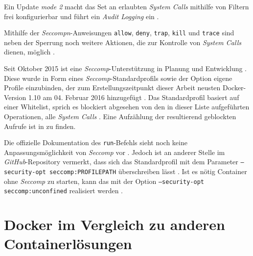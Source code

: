 \documentclass[../main.tex]{subfiles}
\begin{document}
			Ein Update \emph{mode 2} macht das Set an erlaubten \emph{System Calls} mithilfe von Filtern frei konfigurierbar und führt ein \emph{Audit Logging} ein	\cite{linuxSecOverview}\cite{seccompGitDesc}.

			Mithilfe der \emph{Seccompn}-Anweisungen \texttt{allow}, \texttt{deny}, \texttt{trap}, \texttt{kill} und \texttt{trace} sind neben der Sperrung noch weitere Aktionen, die zur Kontrolle von \emph{System Calls} dienen, möglich \cite{docker110Security}.

			Seit Oktober 2015 ist eine \emph{Seccomp}-Unterstützung in Planung und Entwicklung \cite{githubGeneralSecProfiles}\cite{githubSeccompIntegration}. Diese wurde in Form eines \emph{Seccomp}-Standardprofils sowie der Option eigene Profile einzubinden, der zum Erstellungszeitpunkt dieser Arbeit neusten Docker-Version 1.10 am 04. Februar 2016 hinzugefügt \cite{githubDockerChangelog}\cite{githubSeccompDoc}
			\cite{githubSeccompProfile}\cite{docker110Security}. Das Standardprofil basiert auf einer Whitelist, sprich es blockiert abgesehen von den in dieser Liste aufgeführten Operationen, alle \emph{System Calls} \cite{githubSeccompDoc}. Eine Aufzählung der resultierend geblockten Aufrufe ist in \cite{githubSeccompDoc} zu finden.


			Die offizielle Dokumentation des \texttt{run}-Befehls sieht noch keine Anpassungsmöglichkeit von \emph{Seccomp} vor \cite{dockerRun}. Jedoch ist an anderer Stelle im \emph{GitHub}-Repository vermerkt, dass sich das Standardprofil mit dem Parameter \texttt{--security-opt seccomp:PROFILEPATH} überschreiben lässt \cite{githubSeccompDoc}. Ist es nötig Container ohne \emph{Seccomp} zu starten, kann das mit der Option \texttt{--security-opt seccomp:unconfined} realisiert werden \cite{docker110Security}.


	\section{Docker im Vergleich zu anderen Containerlösungen}


\end{document}

